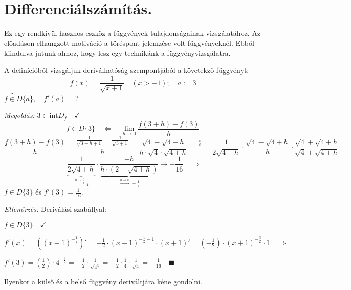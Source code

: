 \documentclass[a4paper,11.5pt]{article}
\begin{document}
	\section{Differenciálszámítás.}
	\begin{note}
		Ez egy rendkívül hasznos eszköz a függvények tulajdonságainak vizsgálatához. Az előadáson elhangzott motiváció a töréspont jelemzése volt függvényeknél. Ebből kiindulva jutunk ahhoz, hogy lesz egy technikánk a függvényvizsgálatra.
	\end{note}
	\begin{task}
		A definícióból vizsgáljuk deriválhatóság szempontjából a követekző függvényt:
		\[ f(x)=\frac{1}{\sqrt{x+1}}\quad (x>-1);\quad a:=3 \]
		$f\overset{?}{\in}D\{a\},\quad f'(a)=?$
		\medskip
		
		\textit{Megoldás:} $3\in\text{int}D_f\quad \checkmark$
		\[ f\in D\{3\}\quad \Leftrightarrow \quad \lim_{h\to0} \frac{f(3+h)-f(3)}{h} \]
		\[ \frac{f(3+h)-f(3)}{h}=\frac{\frac{1}{\sqrt{3+h+1}}-\frac{1}{\sqrt{3+1}}}{h}=\frac{\sqrt{4}-\sqrt{4+h}}{h\cdot\sqrt{4}\cdot\sqrt{4+h}} \quad \overset{\frac{0}{0}}{=}\quad \frac{1}{2\sqrt{4+h}}\cdot\frac{\sqrt{4}-\sqrt{4+h}}{h}\cdot\frac{\sqrt{4}+\sqrt{4+h}}{\sqrt{4}+\sqrt{4+h}}=\]
		\[ =\underbrace{\frac{1}{2\sqrt{4+h}}}_{\overset{h\to0}{\longrightarrow}\frac{1}{4}}\cdot\underbrace{\frac{-h}{h\cdot(2+\sqrt{4+h})}}_{\overset{h\to0}{\longrightarrow}-\frac{1}{4}}\longrightarrow-\frac{1}{16}\quad \Rightarrow\quad \]
		$f\in D\{3\}$ \quad és \quad $f'(3)=\frac{1}{16}$.
		
		\medskip
		\textit{Ellenőrzés:} Deriválási szabállyal:
		\begin{compactenum}
			\item $f\in D\{3\} \quad \checkmark$
			\item $\displaystyle f'(x) = \left((x+1)^{-\frac{1}{2}}\right)'=-\frac{1}{2}\cdot(x-1)^{-\frac{1}{2}-1}\cdot(x+1)'=\left(-\frac{1}{2}\right)\cdot(x+1)^{-\frac{3}{2}}\cdot1\quad \Rightarrow\quad$
			
			$\displaystyle  f'(3)=\left(\frac{1}{2}\right)\cdot4^{-\frac{3}{2}} = -\frac{1}{2}\cdot\frac{1}{\sqrt{4^3}}=-\frac{1}{2}\cdot\frac{1}{4}\cdot\frac{1}{\sqrt{4}}=-\frac{1}{16}\quad \blacksquare$
			
			Ilyenkor a külső és a belső függvény deriváltjára kéne gondolni.
		\end{compactenum}
	\end{task}
\end{document}
